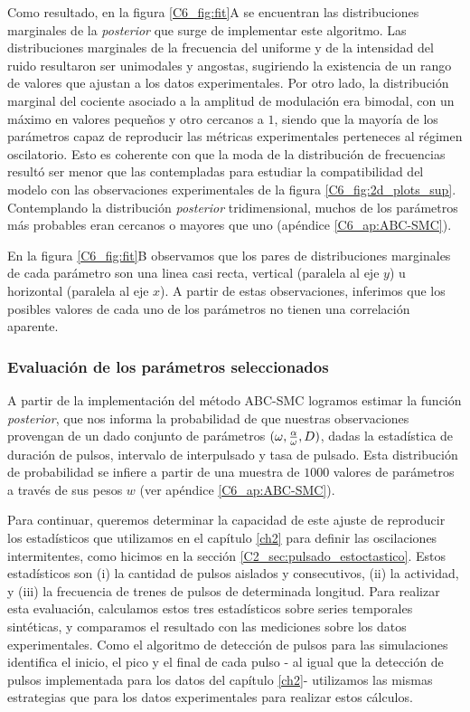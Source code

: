 \documentclass[./main.tex]{subfiles}
\begin{document}
Como resultado, en la figura \ref{C6_fig:fit}A se encuentran las distribuciones marginales de la \textit{posterior} que surge de implementar este algoritmo. Las distribuciones marginales de la frecuencia del uniforme y de la intensidad del ruido resultaron ser unimodales y 
angostas, sugiriendo la existencia de un rango de valores que ajustan a los datos experimentales. Por otro lado, la distribución marginal del cociente \xx asociado a la amplitud de modulación era bimodal, con un máximo en valores pequeños y otro cercanos a $1$, siendo que la mayoría de los parámetros capaz de reproducir las métricas experimentales perteneces al régimen oscilatorio. Esto es coherente con que la moda de la distribución de frecuencias resultó ser menor que las contempladas para estudiar la compatibilidad del modelo con las observaciones experimentales de la figura \ref{C6_fig:2d_plots_sup}. Contemplando la distribución \textit{posterior} tridimensional, muchos de los parámetros más probables eran cercanos o mayores que uno (apéndice \ref{C6_ap:ABC-SMC}).  


En la figura \ref{C6_fig:fit}B observamos que los pares de distribuciones marginales de cada parámetro son una linea casi recta, vertical (paralela al eje $y$) u horizontal (paralela al eje $x$). A partir de estas observaciones, inferimos que los posibles valores de cada uno de los parámetros no tienen una correlación aparente. 


\subsubsection{Evaluación de los parámetros seleccionados}
\label{C6_sssec:evaluac_params}

A partir de la implementación del método ABC-SMC logramos estimar la función \textit{posterior}, que nos informa la probabilidad de que nuestras observaciones provengan de un dado conjunto de parámetros $(\omega,\frac{\alpha}{\omega},D)$, dadas la estadística de duración de pulsos, intervalo de interpulsado y tasa de pulsado. Esta distribución de probabilidad se infiere a partir de una muestra de $1000$ valores de parámetros a través de sus pesos $w$ (ver apéndice \ref{C6_ap:ABC-SMC}). 


Para continuar, queremos determinar la capacidad de este ajuste de reproducir los estadísticos que utilizamos en el capítulo \ref{ch2} para definir las oscilaciones intermitentes, como hicimos en la sección \ref{C2_sec:pulsado_estoctastico}. Estos estadísticos son (i) la cantidad de pulsos aislados y consecutivos, (ii) la actividad, y (iii) la frecuencia de trenes de pulsos de determinada longitud. Para realizar esta evaluación, calculamos estos tres estadísticos sobre series temporales sintéticas, y comparamos el resultado con las mediciones sobre los datos experimentales. Como el algoritmo de detección de pulsos para las simulaciones identifica el inicio, el pico y el final de cada pulso - al igual que la detección de pulsos implementada para los datos del capítulo \ref{ch2}- utilizamos las mismas estrategias que para los datos experimentales para realizar estos cálculos.
\end{document}
